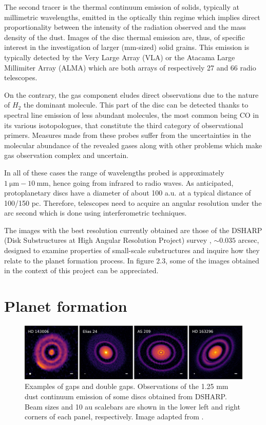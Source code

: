 \documentclass[a4paper,10pt]{report}
\begin{document}
The second tracer is the thermal continuum emission of solids, typically at millimetric wavelengths,
emitted in the optically thin regime which implies direct proportionality between the intensity of the radiation observed and the
mass density of the dust. 
Images of the disc thermal emission are, thus, of specific interest in the investigation of larger (mm-sized) solid grains.
This emission is typically detected by the Very Large Array (VLA) or the Atacama Large Millimiter Array (ALMA) which are both arrays
of respectively 27 and 66 radio telescopes.

On the contrary, the gas component eludes direct observations due to the nature of $H_2$ the dominant molecule.
This part of the disc can be detected thanks to spectral line emission of less abundant molecules,
the most common being CO in its various isotopologues,
that constitute the third category of observational primers. Measures made from these probes suffer from
the uncertainties in the molecular abundance of the revealed gases along with other problems
which make gas observation complex and uncertain.

In all of these cases the range of wavelengths probed is approximately $\SI{1}{\micro\m} - \SI{10}{\mm}$, hence going from infrared to radio waves.
As anticipated, protoplanetary discs have a diameter of about 100 a.u. at a typical distance of 100/150 pc. Therefore, telescopes need to acquire an angular
resolution under the arc second which is done using interferometric techniques.

The images with the best resolution currently obtained are those of the DSHARP (Disk Substructures at High Angular Resolution Project) survey \cite{dsharp}, $\sim 0.035$ arcsec, designed to examine properties
of small-scale substructures and inquire how they relate to the planet formation process. In figure 2.3, some of the images obtained in the context of this project
can be appreciated.

\section{Planet formation}

\begin{figure}
    \begin{center}
        \includegraphics[width=\textwidth]{images/alma_pictures.jpg}
    \end{center}
    \caption{Examples of gaps and double gaps. 
    Observations of the 1.25 mm dust continuum emission of some discs obtained from DSHARP.
    Beam sizes and 10 au scalebars are shown in the lower left and right corners of each panel, respectively.
    Image adapted from \cite{Andrews_2018}.}
\end{figure}
\end{document}
